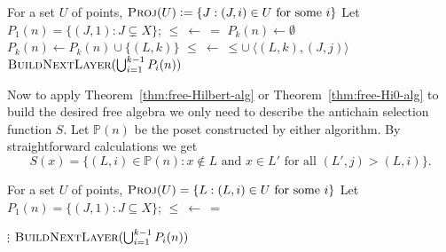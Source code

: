 \documentclass{amsart}
\newcommand{\deq}{\mathrel{\mathop:}=}
\newcommand{\alg}[1]{\mathbf{#1}}
\newcommand{\var}[1]{\mathsf{#1}}
\newcommand{\Cm}[1]{\mathbf{Cm}\, #1}
\begin{document}
{\small
\begin{algorithm}[h]
\caption{Constructing $\Cm{\alg{F}_{\var{Hi}}(n)}$}
\begin{algorithmic}
\State For a set $U$ of points,
$\textsc{Proj}(U) \deq \{J:  (J,i)\in U \text{ for some } i\}$
\State Let $P_1(n) = \{(J,1): J\subsetneq X\}$; $\leq\ \leftarrow\ =$ 
\State $P_k(n)\leftarrow \emptyset$
\State $P_k(n)\leftarrow P_k(n)\cup\{(L, k)\}$
\State $\leq\ \leftarrow\ \leq\cup\ \langle(L,k),(J,j)\rangle$
\EndFor
\EndFor
\EndFunction
{}
\State $\textsc{BuildNextLayer}(\bigcup_{i=1}^{k-1}P_i(n))$
\EndFor
\end{algorithmic}\label{alg:build-P}
\end{algorithm}
}%
Now to apply Theorem~\ref{thm:free-Hilbert-alg} or
Theorem~\ref{thm:free-Hi0-alg} to build the desired
free algebra we only need to describe the
antichain selection function $S$. Let $\mathbb{P}(n)$ be the poset constructed
by either algorithm. By straightforward calculations we get
$$
S(x) = \{(L,i)\in\mathbb{P}(n):
x\notin L \text{ and } x\in L'\text{ for all } (L',j)>(L,i)\}.
$$

{\small
\begin{algorithm}[h]
\caption{Constructing $\Cm{\alg{F}_{\var{Ho}}(n)}$}
\begin{algorithmic}
\State For a set $U$ of points,
$\textsc{Proj}(U) = \{L:  (L,i)\in U \text{ for some } i\}$
\State Let $P_1(n) = \{(J,1): J\subseteq X\}$; $\leq\ \leftarrow\ =$ 

$\vdots$
\State $\textsc{BuildNextLayer}(\bigcup_{i=1}^{k-1}P_i(n))$
\EndFor
\end{algorithmic}\label{alg:build-P0}
\end{algorithm}
}



\end{document}
